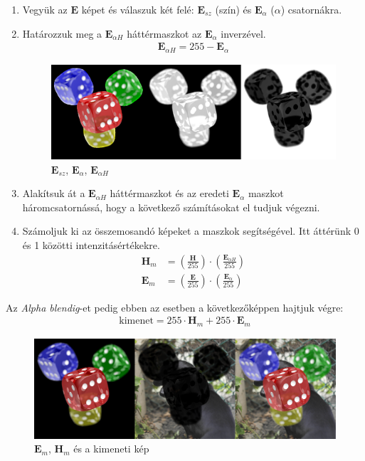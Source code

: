 \begin{enumerate}
	\item Vegyük az $\boldsymbol E$ képet és válaszuk két felé: $\boldsymbol E_{sz}$ (szín) és $\boldsymbol E_\alpha$ ($\alpha$) csatornákra.
	\item Határozzuk meg a $\boldsymbol E_{\alpha H}$ háttérmaszkot az $\boldsymbol E_\alpha$ inverzével.
		\begin{align*}
			\boldsymbol E_{\alpha H} = 255 - \boldsymbol E_\alpha
		\end{align*}
		\begin{figure}[h]
			\centering
			\includegraphics[width=10.24truecm, height=3.41truecm]{images/blending_02.png}
			\caption{$\boldsymbol E_{sz}$, $\boldsymbol E_\alpha$, $\boldsymbol E_{\alpha H}$}
			\label{fig:blend02}
		\end{figure}	
	\item Alakítsuk át a $\boldsymbol E_{\alpha H}$ háttérmaszkot és az eredeti $\boldsymbol E_\alpha$ maszkot háromcsatornássá, hogy a következő számításokat el tudjuk végezni.
	\item Számoljuk ki az összemosandó képeket a maszkok segítségével. Itt áttérünk 0 és 1 közötti intenzitásértékekre.
		\begin{align*}
				\boldsymbol H_m &= \left(\frac{\boldsymbol H}{255}\right) \cdot \left(\frac{\boldsymbol E_{\alpha H}}{255}\right)\\
				\boldsymbol E_m &= \left(\frac{\boldsymbol E}{255}\right) \cdot \left(\frac{\boldsymbol E_\alpha}{255}\right)
		\end{align*}
\end{enumerate}
Az \textit{Alpha blendig}-et pedig ebben az esetben a következőképpen hajtjuk végre:
\begin{align*}
	\text{kimenet} = 255 \cdot \boldsymbol H_m + 255 \cdot \boldsymbol E_m
\end{align*}
\begin{figure}[h]
	\centering
	\includegraphics[width=10.24truecm, height=3.41truecm]{images/blending_03.png}
	\caption{$\boldsymbol E_m$, $\boldsymbol H_m$ és a kimeneti kép}
	\label{fig:blend03}
\end{figure}	
		
